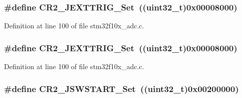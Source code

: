 \subsubsection[{\texorpdfstring{C\+R2\+\_\+\+J\+E\+X\+T\+T\+R\+I\+G\+\_\+\+Set}{CR2_JEXTTRIG_Set}}]{\setlength{\rightskip}{0pt plus 5cm}\#define C\+R2\+\_\+\+J\+E\+X\+T\+T\+R\+I\+G\+\_\+\+Set~(({\bf uint32\+\_\+t})0x00008000)}\hypertarget{group___a_d_c___private___defines_ga20a54958799c567e9efaa0635aa18a99}{}\label{group___a_d_c___private___defines_ga20a54958799c567e9efaa0635aa18a99}


Definition at line 100 of file stm32f10x\+\_\+adc.\+c.

\subsubsection[{\texorpdfstring{C\+R2\+\_\+\+J\+E\+X\+T\+T\+R\+I\+G\+\_\+\+Set}{CR2_JEXTTRIG_Set}}]{\setlength{\rightskip}{0pt plus 5cm}\#define C\+R2\+\_\+\+J\+E\+X\+T\+T\+R\+I\+G\+\_\+\+Set~(({\bf uint32\+\_\+t})0x00008000)}\hypertarget{group___a_d_c___private___defines_ga20a54958799c567e9efaa0635aa18a99}{}\label{group___a_d_c___private___defines_ga20a54958799c567e9efaa0635aa18a99}


Definition at line 100 of file stm32f10x\+\_\+adc.\+c.

\subsubsection[{\texorpdfstring{C\+R2\+\_\+\+J\+S\+W\+S\+T\+A\+R\+T\+\_\+\+Set}{CR2_JSWSTART_Set}}]{\setlength{\rightskip}{0pt plus 5cm}\#define C\+R2\+\_\+\+J\+S\+W\+S\+T\+A\+R\+T\+\_\+\+Set~(({\bf uint32\+\_\+t})0x00200000)}\hypertarget{group___a_d_c___private___defines_ga5292617782f3327f2e1ed0bd9461704e}{}\label{group___a_d_c___private___defines_ga5292617782f3327f2e1ed0bd9461704e}



